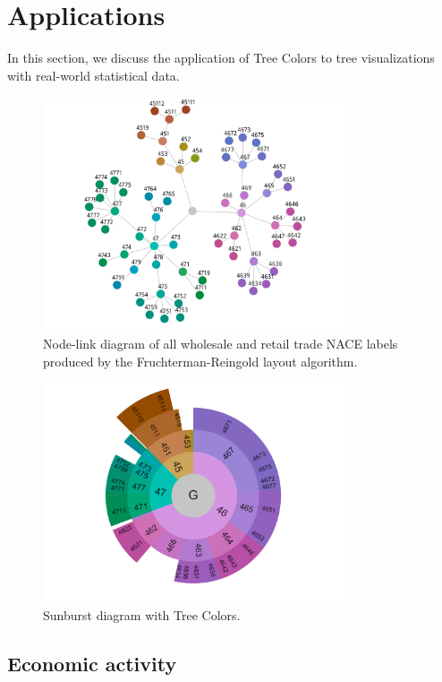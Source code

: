 \documentclass[journal]{vgtc}                %
\begin{document}


\section{Applications}\label{secapplication}

In this section, we discuss the application of Tree Colors to tree visualizations with real-world statistical data.

\begin{figure}[!b]
  \centering
  \includegraphics[width=3.5in]{Gbusiness_FR.pdf}
  \caption{Node-link diagram of all wholesale and retail trade NACE labels produced by the Fruchterman-Reingold layout algorithm.}\label{fig:graphFRApp}
\end{figure}

\begin{figure}[!t]
  \centering
  \includegraphics[width=3.5in]{sunburst/sunburst.pdf}
  \caption{Sunburst diagram with Tree Colors.}\label{fig:sunburst}
  \vspace{-1ex}
\end{figure}


\subsection{Economic activity}
\end{document}
